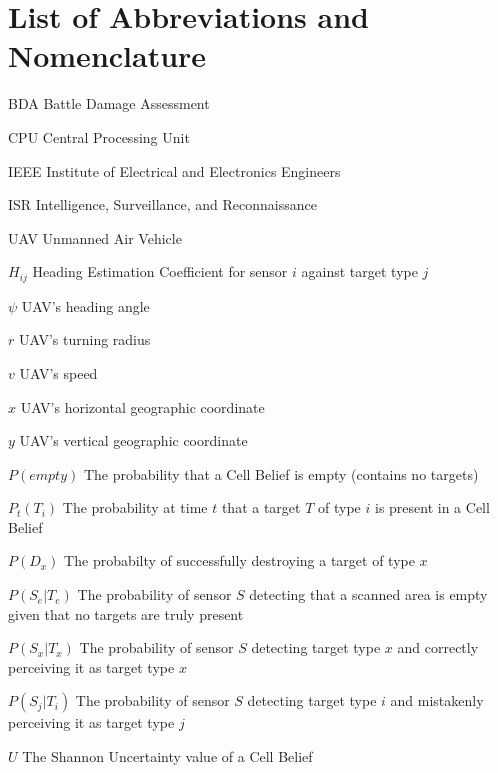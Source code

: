 \chapter*{List of Abbreviations and Nomenclature}
\begin{abbrv}
\item[BDA]				Battle Damage Assessment
\item[CPU]				Central Processing Unit
\item[IEEE]				Institute of Electrical and Electronics Engineers
\item[ISR]              Intelligence, Surveillance, and Reconnaissance
\item[UAV]				Unmanned Air Vehicle
\item[$H_{ij}$] 		Heading Estimation Coefficient for sensor $i$ against target type $j$
\item[$\psi$]           UAV's heading angle
\item[$r$]              UAV's turning radius
\item[$v$] 				UAV's speed
\item[$x$]			    UAV's horizontal geographic coordinate
\item[$y$]			    UAV's vertical geographic coordinate
\item[$P(empty)$] 		The probability that a Cell Belief is empty (contains no targets)
\item[$P_{t}(T_{i})$]   The probability at time $t$ that a target $T$ of type $i$ is present in a Cell Belief
\item[$P(D_{x})$]       The probabilty of successfully destroying a target of type $x$
\item[$P(S_{e}|T_{e})$] The probability of sensor $S$ detecting that a scanned area is empty given that no targets are truly present
\item[$P(S_{x}|T_{x})$] The probability of sensor $S$ detecting target type $x$ and correctly perceiving it as target type $x$
\item[$P(S_{j}|T_{i})$] The probability of sensor $S$ detecting target type $i$ and mistakenly perceiving it as target type $j$
\item[$U$]              The Shannon Uncertainty value of a Cell Belief
\end{abbrv}